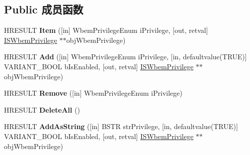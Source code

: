 \subsection*{Public 成员函数}
\begin{DoxyCompactItemize}
\item 
\mbox{\label{interface_wbem_scripting_1_1_i_s_wbem_privilege_set_a3d37b2d3da15c5c5020db6b5f9f818fe}} 
H\+R\+E\+S\+U\+LT {\bfseries Item} (\mbox{[}in\mbox{]} Wbem\+Privilege\+Enum i\+Privilege, \mbox{[}out, retval\mbox{]} \hyperlink{interface_wbem_scripting_1_1_i_s_wbem_privilege}{I\+S\+Wbem\+Privilege} $\ast$$\ast$obj\+Wbem\+Privilege)
\item 
\mbox{\label{interface_wbem_scripting_1_1_i_s_wbem_privilege_set_aa2c9f6ff0f2ed459c7f18738d7ec24a3}} 
H\+R\+E\+S\+U\+LT {\bfseries Add} (\mbox{[}in\mbox{]} Wbem\+Privilege\+Enum i\+Privilege, \mbox{[}in, defaultvalue(T\+R\+UE)\mbox{]} V\+A\+R\+I\+A\+N\+T\+\_\+\+B\+O\+OL b\+Is\+Enabled, \mbox{[}out, retval\mbox{]} \hyperlink{interface_wbem_scripting_1_1_i_s_wbem_privilege}{I\+S\+Wbem\+Privilege} $\ast$$\ast$obj\+Wbem\+Privilege)
\item 
\mbox{\label{interface_wbem_scripting_1_1_i_s_wbem_privilege_set_a5934be4629d37ccb320b389782537273}} 
H\+R\+E\+S\+U\+LT {\bfseries Remove} (\mbox{[}in\mbox{]} Wbem\+Privilege\+Enum i\+Privilege)
\item 
\mbox{\label{interface_wbem_scripting_1_1_i_s_wbem_privilege_set_a9cb44bd04310c09a7268eeab713f105b}} 
H\+R\+E\+S\+U\+LT {\bfseries Delete\+All} ()
\item 
\mbox{\label{interface_wbem_scripting_1_1_i_s_wbem_privilege_set_ab63e28283b802e7edd1e4fa34721df10}} 
H\+R\+E\+S\+U\+LT {\bfseries Add\+As\+String} (\mbox{[}in\mbox{]} B\+S\+TR str\+Privilege, \mbox{[}in, defaultvalue(T\+R\+UE)\mbox{]} V\+A\+R\+I\+A\+N\+T\+\_\+\+B\+O\+OL b\+Is\+Enabled, \mbox{[}out, retval\mbox{]} \hyperlink{interface_wbem_scripting_1_1_i_s_wbem_privilege}{I\+S\+Wbem\+Privilege} $\ast$$\ast$obj\+Wbem\+Privilege)
\end{DoxyCompactItemize}
